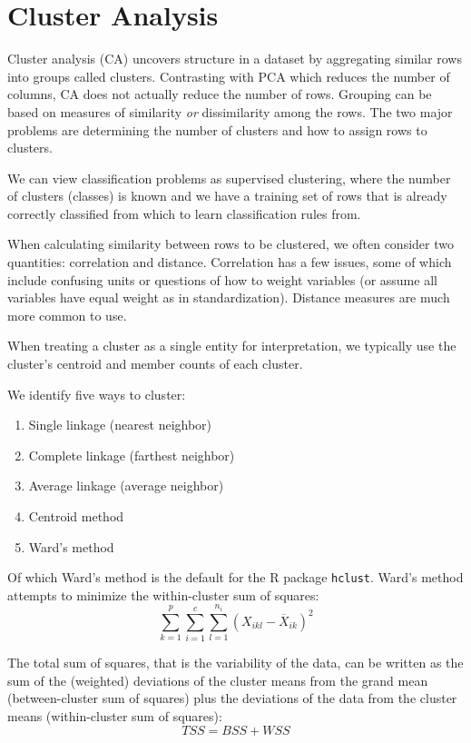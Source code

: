 \section{Cluster Analysis}

\medskip

Cluster analysis (CA) uncovers structure in a dataset by aggregating similar rows into groups called clusters. Contrasting with PCA which reduces the number of columns, CA does not actually reduce the number of rows. Grouping can be based on measures of similarity \textit{or} dissimilarity among the rows. The two major problems are determining the number of clusters and how to assign rows to clusters. 

We can view classification problems as supervised clustering, where the number of clusters (classes) is known and we have a training set of rows that is already correctly classified from which to learn classification rules from. 

When calculating similarity between rows to be clustered, we often consider two quantities: correlation and distance. Correlation has a few issues, some of which include confusing units or questions of how to weight variables (or assume all variables have equal weight as in standardization). Distance measures are much more common to use. 

When treating a cluster as a single entity for interpretation, we typically use the cluster's centroid and member counts of each cluster.

We identify five ways to cluster:
\begin{enumerate}
    \item Single linkage (nearest neighbor)
    \item Complete linkage (farthest neighbor)
    \item Average linkage (average neighbor)
    \item Centroid method
    \item Ward's method
\end{enumerate}

Of which Ward's method is the default for the R package \texttt{hclust}. Ward's method attempts to minimize the within-cluster sum of squares:
\[
\sum_{k=1}^p \sum_{i=1}^c \sum_{l=1}^{n_i} (X_{ikl} - \overline{X}_{ik})^2
\]

\medskip

The total sum of squares, that is the variability of the data, can be written as the sum of the (weighted) deviations of the cluster means from the grand mean (between-cluster sum of squares) plus the deviations of the data from the cluster means (within-cluster sum of squares):
\[
TSS = BSS + WSS
\]

